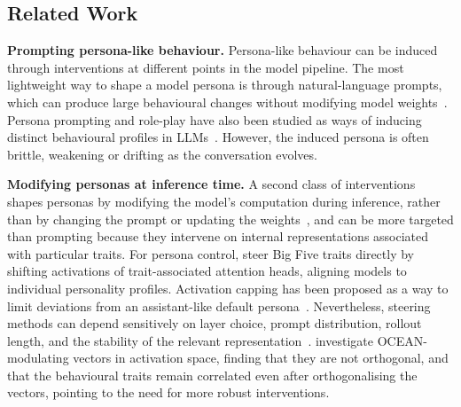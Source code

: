 \subsection{Related Work}\label{sec:related-work}
\textbf{Prompting persona-like behaviour.}
Persona-like behaviour can be induced through interventions at different points in the model pipeline. The most lightweight way to shape a model persona is through natural-language prompts, which can produce large behavioural changes without modifying model weights~\citep{askell2021general, brown2020language, bai2022constitutional}. Persona prompting and role-play have also been studied as ways of inducing distinct behavioural profiles in LLMs~\citep{deshpande2023toxicity, park2023generative, shanahan2023role}. However, the induced persona is often brittle, weakening or drifting as the conversation evolves.

\textbf{Modifying personas at inference time.}
A second class of interventions shapes personas by modifying the model's computation during inference, rather than by changing the prompt or updating the weights~\citep{turner2023activation, zou2023representation, rimsky2024steering, arditi2024refusal, chen2025persona}, and can be more targeted than prompting because they intervene on internal representations associated with particular traits. For persona control, \citet{zhu2024personalityalignment} steer Big Five traits directly by shifting activations of trait-associated attention heads, aligning models to individual personality profiles. Activation capping has been proposed as a way to limit deviations from an assistant-like default persona~\citep{lu2026assistant}. Nevertheless, steering methods can depend sensitively on layer choice, prompt distribution, rollout length, and the stability of the relevant representation~\citep{tan2024analysing, lu2026assistant}. \citet{bhandari2026personalitytraitsinterferegeometric} investigate OCEAN-modulating vectors in activation space, finding that they are not orthogonal, and that the behavioural traits remain correlated even after orthogonalising the vectors, pointing to the need for more robust interventions.

